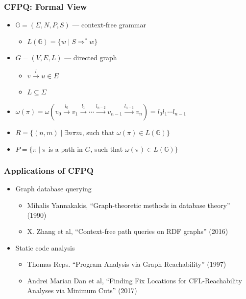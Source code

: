 \documentclass[xcolor=table]{beamer}
\begin{document}
\begin{frame} \frametitle{CFPQ: Formal View}
  \begin{itemize}
    \item $\mathbb{G} = (\Sigma, N, P, S)$ --- context-free grammar
    \begin{itemize}
      \item $L(\mathbb{G}) = \{ w \mid S \Rightarrow^* w \}$
    \end{itemize}
    \pause
    \item $G = (V,E,L)$ --- directed graph
      \begin{itemize}
        \item $v \xrightarrow{l} u \in E$
        \item $L \subseteq \Sigma$
      \end{itemize}
      \pause
    \item $\omega(\pi) = \omega(v_0 \xrightarrow{l_0} v_1 \xrightarrow{l_1} \cdots \xrightarrow{l_{n-2}} v_{n-1} \xrightarrow{l_{n-1}} v_n) = l_0 l_1 \cdots l_{n-1}$
    \pause
    \item $R = \{ (n, m) \mid \exists n \pi m$, such that $\omega(\pi) \in L(\mathbb{G})\}$
    \pause
    \item $P = \{ \pi \mid \pi$ is a path in $G$, such that $\omega(\pi) \in L(\mathbb{G})\}$
  \end{itemize}
\end{frame}


\begin{frame} \frametitle{Applications of CFPQ}
\begin{itemize}
	\item Graph database querying
  \begin{itemize}
  	\item Mihalis Yannakakis, ``Graph-theoretic methods in database theory'' (1990)
    \item X. Zhang et al, ``Context-free path queries on RDF graphs'' (2016)
  \end{itemize}
  \pause
  \item Static code analysis
  \begin{itemize}
  	\item Thomas Reps. ``Program Analysis via Graph Reachability'' (1997)
    \item Andrei Marian Dan et al, ``Finding Fix Locations for CFL-Reachability Analyses via Minimum Cuts'' (2017)
  \end{itemize}
\end{itemize}
\end{frame}
\end{document}
